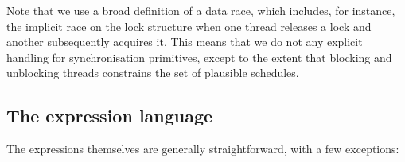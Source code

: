 \documentclass[10pt,a4paper,twocolumn]{article}
\begin{document}
Note that we use a broad definition of a data race, which includes,
for instance, the implicit race on the lock structure when one thread
releases a lock and another subsequently acquires it.  This means that
we do not any explicit handling for synchronisation primitives, except
to the extent that blocking and unblocking threads constrains the set
of plausible schedules.

\subsection{The expression language}

The expressions themselves are generally straightforward, with a few
exceptions:
\end{document}
